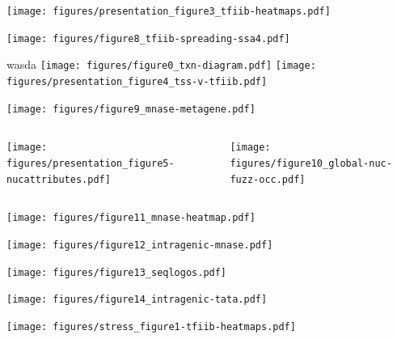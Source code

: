\documentclass[aspectratio=169]{beamer}
\begin{document}
\begin{frame}
\centering
\texttt{[image: figures/presentation\_figure3\_tfiib-heatmaps.pdf]}
\end{frame}

\begin{frame}
\texttt{[image: figures/figure8\_tfiib-spreading-ssa4.pdf]}
\end{frame}

\begin{frame}{wasda}
    \centering
    \texttt{[image: figures/figure0\_txn-diagram.pdf]}
    \texttt{[image: figures/presentation\_figure4\_tss-v-tfiib.pdf]}
\end{frame}

\begin{frame}
\texttt{[image: figures/figure9\_mnase-metagene.pdf]}
\end{frame}

\begin{frame}
    \begin{columns}
        \begin{column}{0.5\textwidth}
            \centering
            \texttt{[image: figures/presentation\_figure5-nucattributes.pdf]}
        \end{column}
        \begin{column}{0.5\textwidth}
            \centering
            \texttt{[image: figures/figure10\_global-nuc-fuzz-occ.pdf]}
        \end{column}
    \end{columns}
\end{frame}

\begin{frame}
\texttt{[image: figures/figure11\_mnase-heatmap.pdf]}
\end{frame}

\begin{frame}
\texttt{[image: figures/figure12\_intragenic-mnase.pdf]}
\end{frame}

\begin{frame}
\texttt{[image: figures/figure13\_seqlogos.pdf]}
\end{frame}

\begin{frame}
\texttt{[image: figures/figure14\_intragenic-tata.pdf]}
\end{frame}

\begin{frame}
\texttt{[image: figures/stress\_figure1-tfiib-heatmaps.pdf]}
\end{frame}
\end{document}
